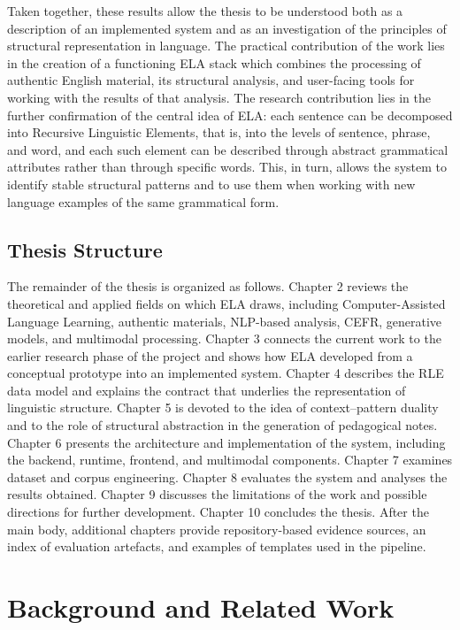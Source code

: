 \documentclass[12pt,a4paper,oneside]{report}
\begin{document}
Taken together, these results allow the thesis to be understood both as a description of an implemented system and as an investigation of the principles of structural representation in language. The practical contribution of the work lies in the creation of a functioning ELA stack which combines the processing of authentic English material, its structural analysis, and user-facing tools for working with the results of that analysis. The research contribution lies in the further confirmation of the central idea of ELA: each sentence can be decomposed into Recursive Linguistic Elements, that is, into the levels of sentence, phrase, and word, and each such element can be described through abstract grammatical attributes rather than through specific words. This, in turn, allows the system to identify stable structural patterns and to use them when working with new language examples of the same grammatical form.

\section{Thesis Structure}
The remainder of the thesis is organized as follows. Chapter 2 reviews the theoretical and applied fields on which ELA draws, including Computer-Assisted Language Learning, authentic materials, NLP-based analysis, CEFR, generative models, and multimodal processing. Chapter 3 connects the current work to the earlier research phase of the project and shows how ELA developed from a conceptual prototype into an implemented system. Chapter 4 describes the RLE data model and explains the contract that underlies the representation of linguistic structure. Chapter 5 is devoted to the idea of context--pattern duality and to the role of structural abstraction in the generation of pedagogical notes. Chapter 6 presents the architecture and implementation of the system, including the backend, runtime, frontend, and multimodal components. Chapter 7 examines dataset and corpus engineering. Chapter 8 evaluates the system and analyses the results obtained. Chapter 9 discusses the limitations of the work and possible directions for further development. Chapter 10 concludes the thesis. After the main body, additional chapters provide repository-based evidence sources, an index of evaluation artefacts, and examples of templates used in the pipeline.

\chapter{Background and Related Work}
\end{document}
